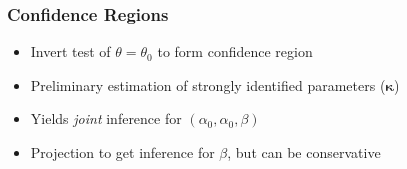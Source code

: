 \documentclass{beamer}
\begin{document}
\begin{frame}
  \frametitle{Confidence Regions}
  \begin{itemize}
    \item Invert test of $\theta = \theta_0$ to form confidence region
    \item Preliminary estimation of strongly identified parameters ($\boldsymbol{\kappa}$)
    \item Yields \emph{joint} inference for $(\alpha_0, \alpha_0, \beta)$
    \item Projection to get inference for $\beta$, but can be conservative
      
  \end{itemize}
\end{frame}
\end{document}
